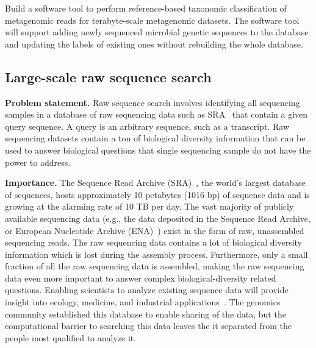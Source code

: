 \begin{rproblem}
Build a software tool to perform reference-based taxonomic classification of metagenomic reads for terabyte-scale metagenomic datasets. The software tool will support adding newly sequenced microbial genetic sequences to the database and updating the labels of existing ones without rebuilding the whole database.
\label{rprob:taxo-meta}
\end{rproblem}



\subsection{Large-scale raw sequence search}

\textbf{Problem statement.} Raw sequence search involves identifying all sequencing samples in a database of raw sequencing data such as SRA~\cite{kodama2012sequence,KatzSLKBO22} that contain a given query sequence. A query is an arbitrary sequence, such as a transcript. Raw sequencing datasets contain a ton of biological diversity information that can be used to answer biological questions that single sequencing sample do not have the power to address.

\noindent
\textbf{Importance.}
The Sequence Read Archive (SRA)~\cite{kodama2012sequence}, the world’s largest database of sequences, hosts approximately 10 petabytes (1016 bp) of sequence data and is growing at the alarming rate of 10 TB per day.
%
The vast majority of publicly available sequencing data (e.g., the data deposited in the Sequence Read Archive, or European Nucleotide Archive (ENA)~\cite{CumminsAABDEGHH22}) exist in the form of raw, unassembled sequencing reads. The raw sequencing data contains a lot of biological diversity information which is lost during the assembly process. Furthermore, only a small fraction of all the raw sequencing data is assembled, making the raw sequencing data even more important to answer complex biological-diversity related questions.
%
Enabling scientists to analyze existing sequence data will provide insight into ecology, medicine, and industrial applications~\cite{LeviRAE18}.
%
The genomics community established this database to enable sharing of the data, but the computational barrier to searching this data leaves the it separated from the people most qualified to analyze it.

